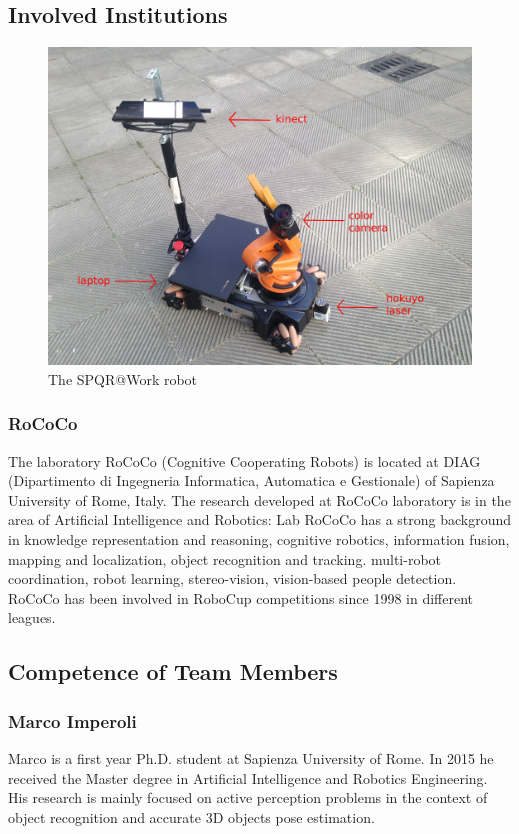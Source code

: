 \documentclass{llncs}
\begin{document}
\subsection{Involved Institutions}
\begin{figure}[t!]
\begin{center}
\includegraphics[width=0.8\linewidth]{images/kuka.JPG}
\end{center}
\caption{The SPQR@Work robot}\label{fig:robot}
\end{figure}

\subsubsection{RoCoCo} The laboratory RoCoCo (Cognitive Cooperating Robots) is located at DIAG (Dipartimento di Ingegneria Informatica, Automatica e Gestionale) of Sapienza University of Rome, Italy.
The research developed at RoCoCo laboratory is in the area of Artificial Intelligence and Robotics: Lab RoCoCo has a strong background in knowledge representation and reasoning, cognitive robotics, information fusion, mapping and localization, object recognition and tracking. multi-robot coordination, robot learning, stereo-vision, vision-based people detection. RoCoCo has been involved in RoboCup competitions since 1998 in different leagues.\\

\subsection{Competence of Team Members}

\subsubsection*{Marco Imperoli}
Marco is a first year Ph.D. student at Sapienza University of Rome. 
In 2015 he received the Master degree in Artificial Intelligence and Robotics Engineering. 
His research is mainly focused on active perception problems in the context of object recognition and accurate 3D objects pose estimation. 
\end{document}

